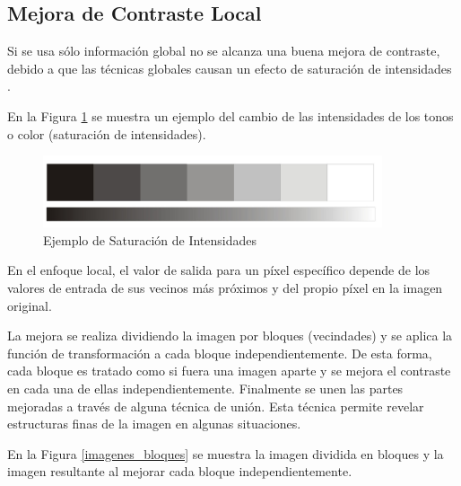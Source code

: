 \subsection{Mejora de Contraste Local}

Si se usa sólo información global no se alcanza una buena mejora de contraste, debido a que las técnicas globales causan un efecto de saturación de intensidades \cite{yu2004fast}. 


En la Figura \ref{saturacion_intensidad} se muestra un ejemplo del cambio de las intensidades de los tonos o color (saturación de intensidades).


\begin{figure}[H]
    \captionsetup[figure]{labelformat=empty}
    \centering
        \includegraphics[width=10cm]{saturacion_intensidad.jpg}    
        \caption{Ejemplo de Saturación de Intensidades}
    \label{saturacion_intensidad}
\end{figure}
 
En el enfoque local, el valor de salida para un píxel específico depende de los valores de entrada de sus vecinos más próximos y del propio píxel en la imagen original.

La mejora se realiza dividiendo la imagen por bloques (vecindades) y se aplica la función de transformación a cada bloque independientemente. De esta forma, cada bloque es tratado como si fuera una imagen aparte y se mejora el contraste en cada una de ellas independientemente. Finalmente se unen las partes mejoradas a través de alguna técnica de unión. Esta técnica permite revelar estructuras finas de la imagen en algunas situaciones.

En la Figura \ref{imagenes_bloques} se muestra la imagen dividida en bloques y la imagen resultante al mejorar cada bloque independientemente.

